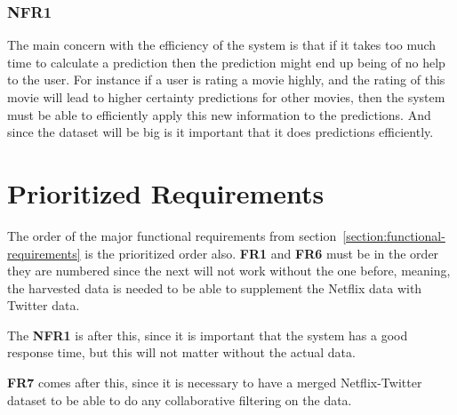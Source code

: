 \subsubsection{NFR1}
The main concern with the efficiency of the system is that if it takes too much time to calculate a prediction then the prediction might end up being of no help to the user. For instance if a user is rating a movie highly, and the rating of this movie will lead to higher certainty predictions for other movies, then the system must be able to efficiently apply this new information to the predictions. And since the dataset will be big is it important that it does predictions efficiently.


\section{Prioritized Requirements}
The order of the major functional requirements from section~\ref{section:functional-requirements} is the prioritized order also. \textbf{FR1} and \textbf{FR6} must be in the order they are numbered since the next will not work without the one before, meaning, the harvested data is needed to be able to supplement the Netflix data with Twitter data.

The \textbf{NFR1} is after this, since it is important that the system has a good response time, but this will not matter without the actual data.

\textbf{FR7} comes after this, since it is necessary to have a merged Netflix-Twitter dataset to be able to do any collaborative filtering on the data.

